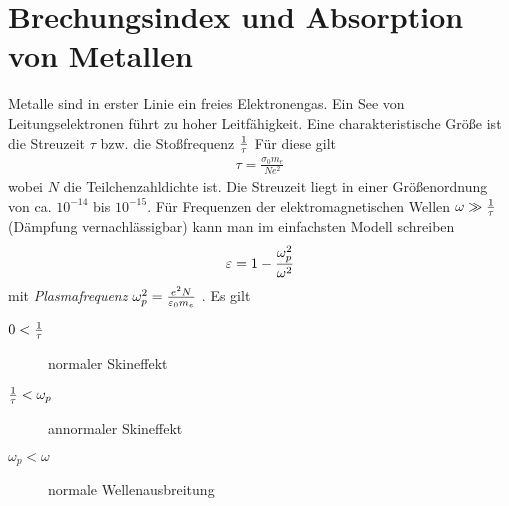 \section{Brechungsindex und Absorption von Metallen}
Metalle sind in erster Linie ein freies Elektronengas. Ein See von
Leitungselektronen führt zu hoher Leitfähigkeit. Eine
charakteristische Größe ist die 
Streuzeit $\tau$%
%
bzw. 
die Stoßfrequenz $\frac{1}{\tau}$%
%
Für diese gilt
\begin{align*}
	\tau=\frac{\sigma_0m_e}{N e^2}
\end{align*}
wobei 
$N$ die Teilchenzahldichte ist.
Die Streuzeit liegt in einer Größenordnung von
ca. $10^{-14}$ bis $10^{-15}$. Für Frequenzen der elektromagnetischen Wellen
$\omega\gg\frac{1}{\tau}$ (Dämpfung vernachlässigbar) kann man im
einfachsten Modell schreiben
\begin{gather}
  \varepsilon = 1 - \frac{\omega_p^2}{\omega^2} \label{Perm}
\end{gather}
mit \emph{Plasmafrequenz}
$\omega_p^2=\frac{e^2N}{\varepsilon_0 m_e}$%
%
.
Es gilt
\begin{description}
\item[$0 < \frac{1}{\tau}$] normaler Skineffekt
\item[$\frac{1}{\tau} < \omega_p$] annormaler Skineffekt
\item[$\omega_p < \omega$] normale Wellenausbreitung
\end{description}

